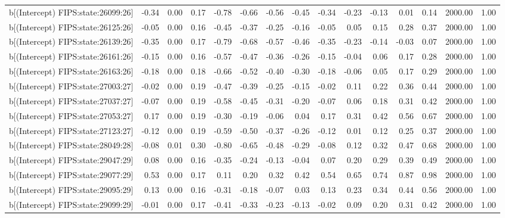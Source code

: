 \begin{table}[ht]
\begin{tabular}{rrrrrrrrrrrrrrr}
  b[(Intercept) FIPS:state:26099:26] & -0.34 & 0.00 & 0.17 & -0.78 & -0.66 & -0.56 & -0.45 & -0.34 & -0.23 & -0.13 & 0.01 & 0.14 & 2000.00 & 1.00 \\ 
  b[(Intercept) FIPS:state:26125:26] & -0.05 & 0.00 & 0.16 & -0.45 & -0.37 & -0.25 & -0.16 & -0.05 & 0.05 & 0.15 & 0.28 & 0.37 & 2000.00 & 1.00 \\ 
  b[(Intercept) FIPS:state:26139:26] & -0.35 & 0.00 & 0.17 & -0.79 & -0.68 & -0.57 & -0.46 & -0.35 & -0.23 & -0.14 & -0.03 & 0.07 & 2000.00 & 1.00 \\ 
  b[(Intercept) FIPS:state:26161:26] & -0.15 & 0.00 & 0.16 & -0.57 & -0.47 & -0.36 & -0.26 & -0.15 & -0.04 & 0.06 & 0.17 & 0.28 & 2000.00 & 1.00 \\ 
  b[(Intercept) FIPS:state:26163:26] & -0.18 & 0.00 & 0.18 & -0.66 & -0.52 & -0.40 & -0.30 & -0.18 & -0.06 & 0.05 & 0.17 & 0.29 & 2000.00 & 1.00 \\ 
  b[(Intercept) FIPS:state:27003:27] & -0.02 & 0.00 & 0.19 & -0.47 & -0.39 & -0.25 & -0.15 & -0.02 & 0.11 & 0.22 & 0.36 & 0.44 & 2000.00 & 1.00 \\ 
  b[(Intercept) FIPS:state:27037:27] & -0.07 & 0.00 & 0.19 & -0.58 & -0.45 & -0.31 & -0.20 & -0.07 & 0.06 & 0.18 & 0.31 & 0.42 & 2000.00 & 1.00 \\ 
  b[(Intercept) FIPS:state:27053:27] & 0.17 & 0.00 & 0.19 & -0.30 & -0.19 & -0.06 & 0.04 & 0.17 & 0.31 & 0.42 & 0.56 & 0.67 & 2000.00 & 1.00 \\ 
  b[(Intercept) FIPS:state:27123:27] & -0.12 & 0.00 & 0.19 & -0.59 & -0.50 & -0.37 & -0.26 & -0.12 & 0.01 & 0.12 & 0.25 & 0.37 & 2000.00 & 1.00 \\ 
  b[(Intercept) FIPS:state:28049:28] & -0.08 & 0.01 & 0.30 & -0.80 & -0.65 & -0.48 & -0.29 & -0.08 & 0.12 & 0.32 & 0.47 & 0.68 & 2000.00 & 1.00 \\ 
  b[(Intercept) FIPS:state:29047:29] & 0.08 & 0.00 & 0.16 & -0.35 & -0.24 & -0.13 & -0.04 & 0.07 & 0.20 & 0.29 & 0.39 & 0.49 & 2000.00 & 1.00 \\ 
  b[(Intercept) FIPS:state:29077:29] & 0.53 & 0.00 & 0.17 & 0.11 & 0.20 & 0.32 & 0.42 & 0.54 & 0.65 & 0.74 & 0.87 & 0.98 & 2000.00 & 1.00 \\ 
  b[(Intercept) FIPS:state:29095:29] & 0.13 & 0.00 & 0.16 & -0.31 & -0.18 & -0.07 & 0.03 & 0.13 & 0.23 & 0.34 & 0.44 & 0.56 & 2000.00 & 1.00 \\ 
  b[(Intercept) FIPS:state:29099:29] & -0.01 & 0.00 & 0.17 & -0.41 & -0.33 & -0.23 & -0.13 & -0.02 & 0.09 & 0.20 & 0.31 & 0.42 & 2000.00 & 1.00 \\ 

\end{tabular}
\end{table}
